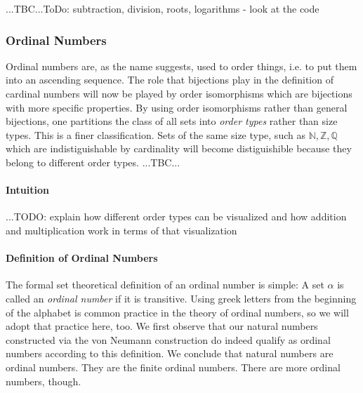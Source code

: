 ...TBC...ToDo: subtraction, division, roots, logarithms - look at the code







%



\subsubsection{Ordinal Numbers}
Ordinal numbers are, as the name suggests, used to order things, i.e. to put them into an ascending sequence. The role that bijections play in the definition of cardinal numbers will now be played by order isomorphisms which are bijections with more specific properties. By using order isomorphisms rather than general bijections, one partitions the class of all sets into \emph{order types} rather than size types. This is a finer classification. Sets of the same size type, such as $\mathbb{N}, \mathbb{Z}, \mathbb{Q}$ which are indistiguishable by cardinality will become distiguishible because they belong to different order types. ...TBC...


\paragraph{Intuition} ...TODO: explain how different order types can be visualized and how addition and multiplication work in terms of that visualization

\paragraph{Definition of Ordinal Numbers}
The formal set theoretical definition of an ordinal number is simple: A set $\alpha$ is called an \emph{ordinal number} if it is transitive. Using greek letters from the beginning of the alphabet is common practice in the theory of ordinal numbers, so we will adopt that practice here, too. We first observe that our natural numbers constructed via the von Neumann construction do indeed qualify as ordinal numbers according to this definition. We conclude that natural numbers are ordinal numbers. They are the finite ordinal numbers. There are more ordinal numbers, though. 

